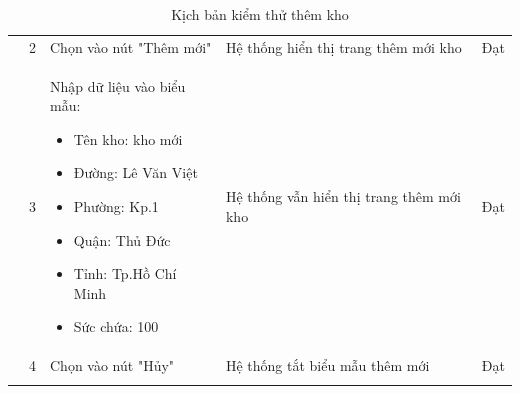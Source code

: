 {\begin{longtable}{| p{2.5cm}| p{1cm}| p{5.5cm}| p{4.5cm} | p{1.5cm} |}
        \cline{2-5}
                                             & 2                                        & Chọn vào nút "Thêm mới"       & Hệ thống hiển thị trang thêm mới kho    & Đạt             \\
        \cline{2-5}
                                             & 3                                        & Nhập dữ liệu vào biểu mẫu:
        \begin{itemize}
            \item Tên kho: kho mới
            \item Đường: Lê Văn Việt
            \item Phường: Kp.1
            \item Quận: Thủ Đức
            \item Tỉnh: Tp.Hồ Chí Minh
            \item Sức chứa: 100
        \end{itemize}           & Hệ thống vẫn hiển thị trang thêm mới kho & Đạt                                                                                                    \\
        \cline{2-5}
                                             & 4                                        & Chọn vào nút "Hủy"            & Hệ thống tắt biểu mẫu thêm mới          & Đạt             \\
        \hline
        \caption{Kịch bản kiểm thử thêm kho}
    \end{longtable}
}


